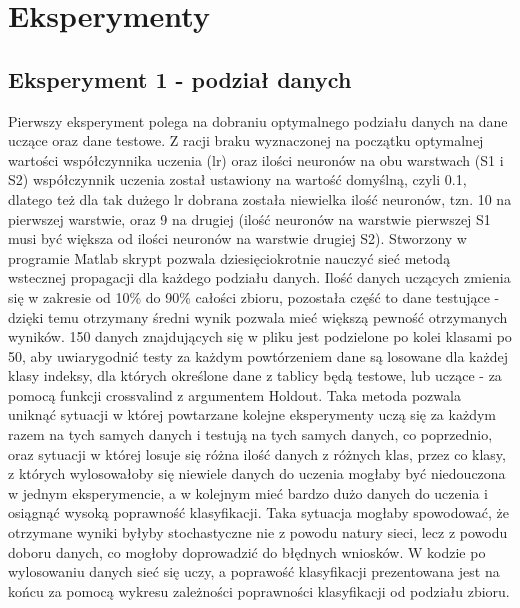 \documentclass[a4paper, 12pt]{report}
\begin{document}
\chapter{Eksperymenty}
\section{Eksperyment 1 - podział danych}
Pierwszy eksperyment polega na dobraniu optymalnego podziału danych na dane uczące oraz dane testowe. Z racji braku wyznaczonej na początku optymalnej wartości współczynnika uczenia (lr) oraz ilości neuronów na obu warstwach (S1 i S2) współczynnik uczenia został ustawiony na wartość domyślną, czyli 0.1, dlatego też dla tak dużego lr dobrana została niewielka ilość neuronów, tzn. 10 na pierwszej warstwie, oraz 9 na drugiej (ilość neuronów na warstwie pierwszej S1 musi być większa od ilości neuronów na warstwie drugiej S2).
Stworzony w programie Matlab skrypt pozwala dziesięciokrotnie nauczyć sieć metodą wstecznej propagacji \cite{online1} dla każdego podziału danych. Ilość danych uczących zmienia się w zakresie od 10\% do 90\% całości zbioru, pozostała część to dane testujące - dzięki temu otrzymany średni wynik pozwala mieć większą pewność otrzymanych wyników. 150 danych znajdujących się w pliku jest podzielone po kolei klasami po 50, aby uwiarygodnić testy za każdym powtórzeniem dane są losowane dla każdej klasy indeksy, dla których określone dane z tablicy będą testowe, lub uczące - za pomocą funkcji crossvalind z argumentem Holdout\cite{online2}. Taka metoda pozwala uniknąć sytuacji w której powtarzane kolejne eksperymenty uczą się za każdym razem na tych samych danych i testują na tych samych danych, co poprzednio, oraz sytuacji w której losuje się różna ilość danych z różnych klas, przez co klasy, z których wylosowałoby się niewiele danych do uczenia mogłaby być niedouczona w jednym eksperymencie, a w kolejnym mieć bardzo dużo danych do uczenia i osiągnąć wysoką poprawność klasyfikacji. Taka sytuacja mogłaby spowodować, że otrzymane wyniki byłyby stochastyczne nie z powodu natury sieci, lecz z powodu doboru danych, co mogłoby doprowadzić do błędnych wniosków.
W kodzie po wylosowaniu danych sieć się uczy, a poprawość klasyfikacji prezentowana jest na końcu za pomocą wykresu zależności poprawności klasyfikacji od podziału zbioru.
 
\end{document}
